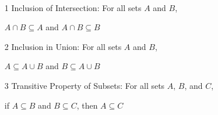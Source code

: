\documentclass[12pt]{article}
\begin{document}
\begin{theorem}[6.2.1(Epp)]
\hfill\\
\normalfont 
\begin{enumerate}
\item[1] Inclusion of Intersection: For all sets $A$ and $B$,
\item[] $A\cap B\subseteq A$ and $A\cap B\subseteq B$
\item[2] Inclusion in Union: For all sets $A$ and $B$,
\item[] $A\subseteq A\cup B$ and $B\subseteq A\cup B$
\item[3] Transitive Property of Subsets: For all sets $A$, $B$, and $C$,
\item[] if $A\subseteq B$ and $B\subseteq C$, then $A\subseteq C$
\end{enumerate}
\end{theorem}
\end{document}
